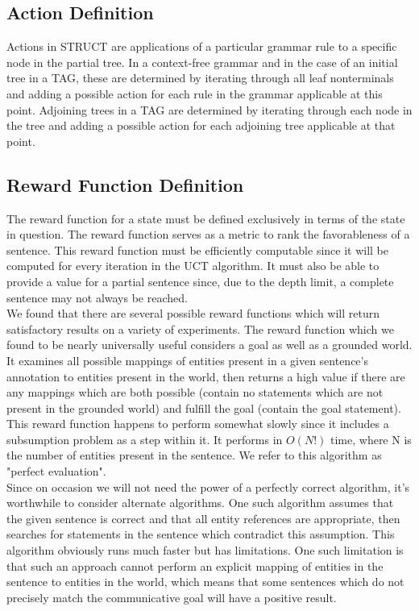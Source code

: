 \subsection{Action Definition}

Actions in STRUCT are applications of a particular grammar rule to a specific node in the partial tree. In a
context-free grammar and in the case of an initial tree in a TAG, these are determined by iterating through all leaf
nonterminals and adding a possible action for each rule in the grammar applicable at this point. Adjoining trees in a
TAG are determined by iterating through each node in the tree and adding a possible action for each adjoining tree
applicable at that point.\\

 \subsection{Reward Function Definition}

 The reward function for a state must be defined exclusively in terms
 of the state in question.  The reward function serves as a metric to
 rank the favorableness of a sentence.  This reward function must be
 efficiently computable since it will be computed for every iteration
 in the UCT algorithm.  It must also be able to provide a value for a
 partial sentence since, due to the depth limit, a complete sentence
 may not always be reached.\\
 
 We found that there are several possible reward functions which will
 return satisfactory results on a variety of experiments.  The reward function
 which we found to be nearly universally useful considers a goal as well as a 
 grounded world.  It examines all possible mappings of entities present in
 a given sentence's annotation to entities present in the world, then returns
 a high value if there are any mappings which are both possible (contain no statements
 which are not present in the grounded world) and fulfill the goal (contain the
 goal statement).\\

This reward function happens to perform somewhat slowly since it includes
a subsumption problem as a step within it.  It performs in $O(N!)$ time, where
N is the number of entities present in the sentence.  We refer to this algorithm as
"perfect evaluation".\\

Since on occasion we will not need the power of a perfectly correct algorithm,
it's worthwhile to consider alternate algorithms.  One such algorithm assumes that
the given sentence is correct and that all entity references are appropriate, then
searches for statements in the sentence which contradict this assumption.  This
algorithm obviously runs much faster but has limitations.  One such limitation is
that such an approach cannot perform an explicit mapping of entities in the sentence
to entities in the world, which means that some sentences which do not precisely
match the communicative goal will have a positive result.

